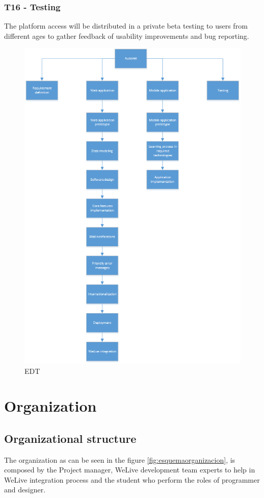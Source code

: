 \documentclass{DeustoFDP}
\begin{document}
\subsubsection{T16 - Testing}
The platform access will be distributed in a private beta testing to users from different ages to gather feedback of usability improvements and bug reporting. 

\newpage
\begin{figure}[H]
\centering
\includegraphics[width=0.9\linewidth]{fig/EDT}
\caption[EDT]{EDT}
\label{fig:EDT}
\end{figure}


\section{Organization}
\subsection{Organizational structure}
The organization as can be seen in the figure \ref{fig:esquemaorganizacion}, is composed by the Project manager, WeLive development team experts to help in WeLive integration process and the student who perform the roles of programmer and designer.
\end{document}
